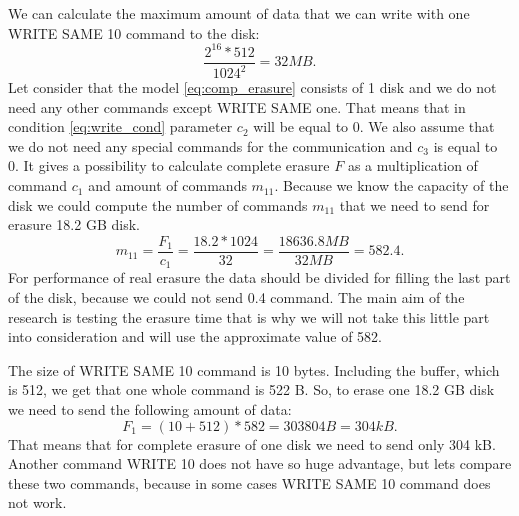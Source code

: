 We can calculate the maximum amount of data that we can write with one WRITE SAME 10 command to the disk:
\begin{equation}
	\frac{2^{16}*512}{1024^2} = 32 MB.
\end{equation}
Let consider that the model \ref{eq:comp_erasure} consists of 1 disk and we do not need any other commands except WRITE SAME one. That means that in condition \ref{eq:write_cond} parameter $c_2$ will be equal to 0. We also assume that we do not need any special commands for the communication and $c_3$ is equal to 0. It gives a possibility to calculate complete erasure $F$ as a multiplication of command $c_1$ and amount of commands $m_{11}$. Because we know the capacity of the disk we could compute the number of commands $m_{11}$ that we need to send for erasure 18.2 GB disk.
\begin{equation}
	m_{11} =\frac{F_1}{c_1} = \frac{18.2*1024}{32} = \frac{18636.8MB}{32MB} = 582.4.
\end{equation}
For performance of real erasure the data should be divided for filling the last part of the disk, because we could not send 0.4 command. The main aim of the research is testing the erasure time that is why we will not take this little part into consideration and will use the approximate value of 582.

The size of WRITE SAME 10 command is 10 bytes. Including the buffer, which is 512, we get that one whole command is 522 B.
So, to erase one 18.2 GB disk we need to send the following amount of data:
\begin{equation}
	F_1 = (10 + 512)*582 = 303804 B = 304 kB.
\end{equation}
That means that for complete erasure of one disk we need to send only 304 kB. Another command WRITE 10 does not have so huge advantage, but lets compare these two commands, because in some cases WRITE SAME 10 command does not work.


